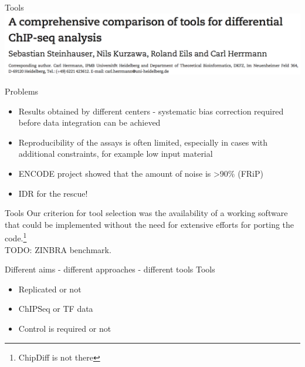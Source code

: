 \documentclass{beamer}
\begin{document}
\begin{frame}{Tools}
\includegraphics[width=\linewidth]{paperDPC.png}
\end{frame}

\begin{frame}{Problems}
\begin{itemize}
\item  Results obtained by different centers -  systematic bias correction required before data integration can be achieved
\item Reproducibility of the assays is often limited, especially in cases with additional constraints, for example low input material
\item ENCODE project showed that the amount of noise is >90\% (FRiP)
\item IDR for the rescue!
\end{itemize}
\end{frame}

\begin{frame}{Tools}
 Our criterion for tool selection was the availability of a working software that could be implemented without the need for extensive efforts for porting the code.\footnote{ChipDiff is not there}\\
 TODO: ZINBRA benchmark.
\end{frame}

\begin{frame}{Different aims - different approaches - different tools}
Tools
\begin{itemize}
\item Replicated or not
\item ChIPSeq or TF data
\item Control is required or not
\end{itemize}
\end{frame}
\end{document}

